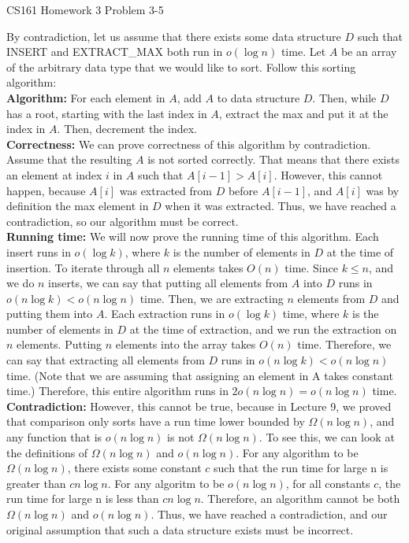 \documentclass[12pt]{article}
\begin{document}
\begin{center}
{\Large CS161 Homework 3 Problem 3-5}

\end{center}

By contradiction, let us assume that there exists some data structure $D$ such that INSERT and EXTRACT\_MAX both run in $o(\log n)$ time. Let $A$ be an array of the arbitrary data type that we would like to sort. Follow this sorting algorithm:\\
\textbf{Algorithm:} For each element in $A$, add $A$ to data structure $D$. 
Then, while $D$ has a root, starting with the last index in $A$, extract the max and put it at the index in $A$. Then, decrement the index. \\
\textbf{Correctness:} We can prove correctness of this algorithm by contradiction. Assume that the resulting $A$ is not sorted correctly. That means that there exists an element at index $i$ in $A$ such that $A[i-1] > A[i]$. However, this cannot happen, because $A[i]$ was extracted from $D$ before $A[i-1]$, and $A[i]$ was by definition the max element in $D$ when it was extracted. Thus, we have reached a contradiction, so our algorithm must be correct.\\
\textbf{Running time:} We will now prove the running time of this algorithm. Each insert runs in $o(\log k)$, where $k$ is the number of elements in $D$ at the time of insertion. To iterate through all $n$ elements takes $O(n)$ time. Since $k \le n$, and we do $n$ inserts, we can say that putting all elements from $A$ into $D$ runs in $o(n \log k) < o(n \log n)$ time. Then, we are extracting $n$ elements from $D$ and putting them into $A$. Each extraction runs in $o(\log k)$ time, where $k$ is the number of elements in $D$ at the time of extraction, and we run the extraction on $n$ elements. Putting $n$ elements into the array takes $O(n)$ time. Therefore, we can say that extracting all elements from $D$ runs in $o(n \log k) < o(n \log n)$ time. (Note that we are assuming that assigning an element in A takes constant time.) Therefore, this entire algorithm runs in $2o(n \log n) = o(n \log n)$ time.\\ 
\textbf{Contradiction:} However, this cannot be true, because in Lecture 9, we proved that comparison only sorts have a run time lower bounded by $\Omega(n \log n)$, and any function that is $o(n \log n)$ is not $\Omega(n \log n)$. To see this, we can look at the definitions of $\Omega(n \log n)$ and $o(n \log n)$. For any algorithm to be $\Omega(n \log n)$, there exists some constant $c$ such that the run time for large n is greater than $cn \log n$. For any algoritm to be $o(n \log n)$, for all constants $c$, the run time for large n is less than $cn \log n$. Therefore, an algorithm cannot be both $\Omega(n \log n)$ and $o(n \log n)$. Thus, we have reached a contradiction, and our original assumption that such a data structure exists must be incorrect. 
\end{document}
